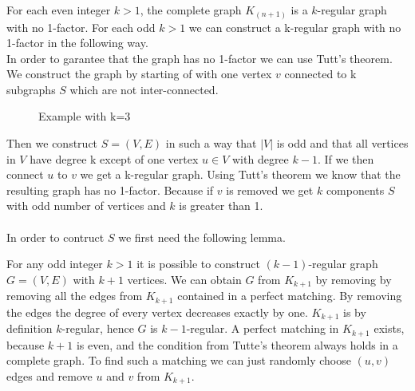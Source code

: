 \documentclass[a4paper]{article}
\begin{document}
	\newpage
	\begin{solution}{11}
		For each even integer $k > 1$, the complete graph $K_{(n+1)}$ is a $k$-regular graph with no 1-factor. 
		For each odd $k > 1$ we can construct a k-regular graph with no 1-factor in the following way. \\
		In order to garantee that the graph has no 1-factor we can use Tutt's theorem. 
		We construct the graph by starting of with one vertex $v$ connected to k subgraphs $S$ which are not inter-connected. 
		\begin{figure}[h]
			\centering
		\caption{Example with k=3}
		\end{figure}
		Then we construct $S=(V,E)$ in such a way that $|V|$ is odd and that all vertices in $V$ have degree k except of one vertex $u \in V$ with degree $k-1$. 
		If we then connect $u$ to $v$ we get a k-regular graph. 
		Using Tutt's theorem we know that the resulting graph has no 1-factor. 
		Because if $v$ is removed we get $k$ components $S$ with odd number of vertices and $k$ is greater than 1.\\ \\
		
		In order to contruct $S$ we first need the following lemma.
		\begin{lemma}{For any odd integer $k > 1$ it is possible to construct $(k-1)$-regular graph $G=(V,E)$ with $k+1$ vertices.}
			We can obtain $G$ from $K_{k+1}$ by removing by removing all the edges from $K_{k+1}$ contained in a perfect matching. 
			By removing the edges the degree of every vertex decreases exactly by one. 
			$K_{k+1}$ is by definition $k$-regular, hence $G$ is $k-1$-regular. 
			A perfect matching in $K_{k+1}$ exists, because $k+1$ is even, and the condition from Tutte's theorem always holds in a complete graph. 
			To find such a matching we can just randomly choose $(u,v)$ edges and remove $u$ and $v$ from $K_{k+1}$. 
		\end{lemma}
		

\end{solution}
\end{document}

